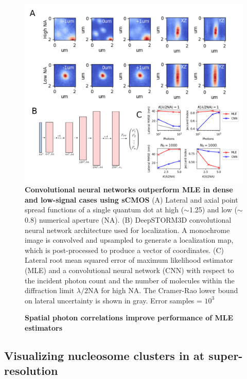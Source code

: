 \documentclass{ucetd}
\begin{document}
\begin{figure}
\begin{center}
\includegraphics[width=14cm]{PSF2D.png}
\end{center}
\caption{\textbf{Convolutional neural networks outperform MLE in dense and low-signal cases using sCMOS} (A) Lateral and axial point spread functions of a single quantum dot at high ($\sim$1.25) and low ($\sim$0.8) numerical aperture (NA). (B) DeepSTORM3D convolutional neural network architecture used for localization. A monochrome image is convolved and upsampled to generate a localization map, which is post-processed to produce a vector of coordinates. (C) Lateral root mean squared error of maximum likelihood estimator (MLE) and a convolutional neural network (CNN) with respect to the incident photon count and the number of molecules within the diffraction limit $\lambda/2\mathrm{NA}$ for high NA. The Cramer-Rao lower bound on lateral uncertainty is shown in gray. Error samples = $10^{3}$}
\end{figure}

\begin{figure}
\begin{center}
\end{center}
\caption{\textbf{Spatial photon correlations improve performance of MLE estimators}}
\end{figure}

\subsection{Visualizing nucleosome clusters in at super-resolution}
\end{document}
